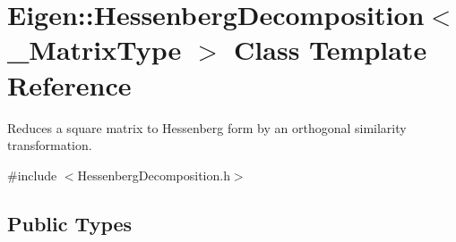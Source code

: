 \hypertarget{class_eigen_1_1_hessenberg_decomposition}{}\section{Eigen\+::Hessenberg\+Decomposition$<$ \+\_\+\+Matrix\+Type $>$ Class Template Reference}
\label{class_eigen_1_1_hessenberg_decomposition}


Reduces a square matrix to Hessenberg form by an orthogonal similarity transformation.  




{\ttfamily \#include $<$Hessenberg\+Decomposition.\+h$>$}

\subsection*{Public Types}
